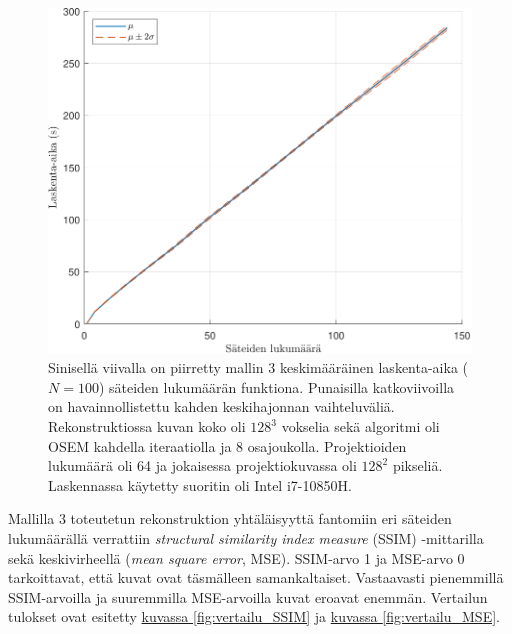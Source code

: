 \begin{figure}[H]
    \centering
    \captionsetup{width=.9\linewidth}
    \includegraphics[width=.9\linewidth]{kuvat/laskenta_aika.pdf}
    \caption{Sinisellä viivalla on piirretty mallin 3 keskimääräinen laskenta-aika ($N=100$) säteiden lukumäärän funktiona. Punaisilla katkoviivoilla on havainnollistettu kahden keskihajonnan vaihteluväliä. Rekonstruktiossa kuvan koko oli $128^3$ vokselia sekä algoritmi oli OSEM kahdella iteraatiolla ja 8 osajoukolla. Projektioiden lukumäärä oli 64 ja jokaisessa projektiokuvassa oli $128^2$ pikseliä. Laskennassa käytetty suoritin oli Intel i7-10850H.}
    \label{fig:laskenta_aika}
\end{figure}

Mallilla 3 toteutetun rekonstruktion yhtäläisyyttä fantomiin eri säteiden lukumäärällä verrattiin \textit{structural similarity index measure} (SSIM) -mittarilla sekä keskivirheellä (\textit{mean square error}, MSE). SSIM-arvo 1 ja MSE-arvo 0 tarkoittavat, että kuvat ovat täsmälleen samankaltaiset. Vastaavasti pienemmillä SSIM-arvoilla ja suuremmilla MSE-arvoilla kuvat eroavat enemmän. Vertailun tulokset ovat esitetty \hyperref[fig:vertailu_SSIM]{kuvassa \ref*{fig:vertailu_SSIM}} ja \hyperref[fig:vertailu_MSE]{kuvassa \ref*{fig:vertailu_MSE}}.


